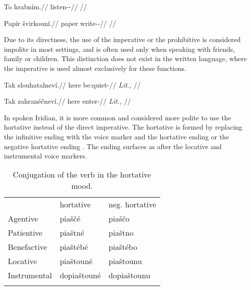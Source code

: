 \pex
\begingl
    \gla To hrabním.//
    \glb \Dem{} listen-\Pv{}-\Imp{}//
    \glft {}//
\endgl
\xe

\pex
\begingl
    \gla Papír švirkouní.//
    \glb paper write-\Lv{}-\N{}\Imp{}//
    \glft {}//
\endgl
\xe

Due to its directness, the use of the imperative or the prohibitive is
considered impolite in most settings, and is often used only when speaking with
friends, family or children. This distinction does not exist in the written
language, where the imperative is used almost exclusively for these functions.

\pex
\begingl
    \gla Tak slouhatalneví.//
    \glb here be:quiet-//
    \glft {} \textit{Lit.,} //
\endgl
\xe

\pex
\begingl
    \gla Tak zahranéčneví.//
    \glb here enter-//
    \glft {} \textit{Lit.,} //
\endgl
\xe

In spoken Iridian, it is more common and considered more polite to use the
hortative instead of the direct imperative. The hortative is formed by replacing
the infinitive ending  with the voice marker and the hortative ending
 or the negative hortative ending . The ending  surfaces
as  after the locative and instrumental voice markers.

\begin{table}
    \footnotesize\sffamily
		\caption{Conjugation of the verb  in the hortative mood.}
		\label{tbl:hortative}
		\medskip
    \begin{tabu}to 0.7
         \toprule \addlinespace
         &{\sc hortative}&{\sc neg. hortative}  \\ \addlinespace
         \midrule \addlinespace
         Agentive &
         {piaščé} & 
         {piaščo}\\ \addlinespace

         Patientive &
         {piaštné}&
         {piaštno}\\ \addlinespace

         Benefactive &
         {piaštébé} &
		 {piaštébo}\\ \addlinespace

         Locative &
         {piaštouné} &
		 {piaštounu}\\ \addlinespace

         Instrumental &
         {dopiaštouné} &
		 {dopiaštounu}\\ \addlinespace

         \bottomrule
    \end{tabu}

\end{table}

